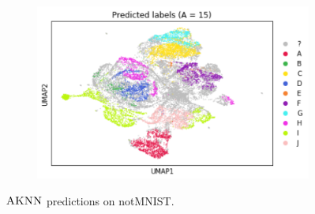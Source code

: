\documentclass{article}
\newcommand{\algname}{\textsc{AKNN}}
\begin{document}
\begin{figure}
\begin{subfigure}[t]{0.34\textwidth}
        \includegraphics[width=\linewidth]{figs/notMNIST/notMNIST_preds_Aeq15.png} %
    \end{subfigure}
    \hfill
  \caption{$\algname$ predictions on notMNIST.}
  \label{fig:varyingparam}
\end{figure}
\end{document}
